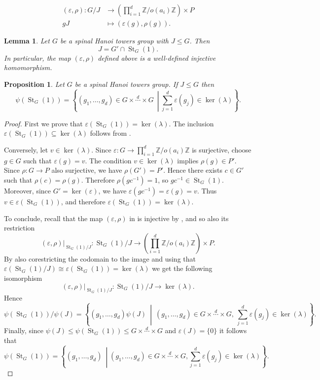 \documentclass[10pt,a4paper]{amsart}
\newtheorem{proposition}{Proposition}
\newtheorem{lemma}{Lemma}
\DeclareMathOperator{\St}{St}
\begin{document}
\begin{align}\label{GJhookexplicit}
    (\varepsilon,\rho):G/J&\longrightarrow \left(\prod_{i=1}^d\mathbb Z/o(a_i)\mathbb Z \right)\times P\\
    gJ&\longmapsto (\varepsilon(g),\rho(g)).\nonumber
\end{align}

\begin{lemma}\label{lem:JeqGprimeSt}
Let $G$ be a spinal Hanoi towers group with $J\leq G$. Then
\[
J=G'\cap \St_G(1).
\]
In particular, the map $(\varepsilon,\rho)$ defined above is a well-defined injective homomorphism.
\end{lemma}

\begin{proposition}\label{prop:sufficient-condition-first-stabilizer}
Let $G$ be a spinal Hanoi towers group. If $J\leq G$ then 
\[
\psi(\St_G(1))
=
\left\{
(g_1,\ldots,g_d)\in G\times \stackrel{d}{\cdots}\times G \ \middle| \sum_{j=1}^d \varepsilon(g_j)\in \ker(\lambda)
\right\}.
\]
\end{proposition}

\begin{proof}
First we prove that $\varepsilon(\St_G(1))=\ker(\lambda)$.
The inclusion $\varepsilon(\St_G(1))\subseteq \ker(\lambda)$ follows from .


Conversely, let $v\in\ker(\lambda)$. Since $\varepsilon:G\to \prod_{i=1}^d \mathbb Z/o(a_i)\mathbb Z$
is surjective, choose $g\in G$ such that $\varepsilon(g)=v$. The condition $v\in\ker(\lambda)$ implies $\rho(g)\in P'$. Since $\rho:G\to P$ also surjective, we have $\rho(G')=P'$. Hence there exists $c\in G'$ such that $\rho(c)=\rho(g)$. Therefore $\rho(gc^{-1})=1$, so $gc^{-1}\in \St_G(1)$. Moreover, since $G'=\ker(\varepsilon)$, we have $\varepsilon(gc^{-1})=\varepsilon(g)=v$.
Thus $v\in \varepsilon(\St_G(1))$, and therefore $\varepsilon(\St_G(1))=\ker(\lambda)$. 

To conclude, recall that the map $(\varepsilon,\rho)$ in  is injective by , and so also its restriction
\[
(\varepsilon,\rho)|_{\St_G(1)/J}:\St_G(1)/J\longrightarrow \left(\prod_{i=1}^d\mathbb Z/o(a_i)\mathbb Z \right)\times P.
\]
By also corestricting the codomain to the image and using that $\varepsilon(\St_G(1)/J)\cong\varepsilon(\St_G(1))=\ker(\lambda)$  we get the following isomorphism
\[
(\varepsilon,\rho)|_{\St_G(1)/J}:\St_G(1)/J\longrightarrow \ker(\lambda).
\]
Hence
\[
\psi(\St_G(1))/\psi(J)
=
\left\{
(g_1,\ldots,g_d)\psi(J)
\ \middle|\
(g_1,\ldots,g_d)\in G\times \stackrel{d}{\cdots}\times G,\ 
\sum_{j=1}^d \varepsilon(g_j)\in \ker(\lambda)
\right\}.
\]
Finally, since $\psi(J)\leq\psi(\St_G(1))\leq G\times \stackrel{d}{\cdots}\times G$ and $\varepsilon(J)=\{0\}$ it follows that
\[
\psi(\St_G(1))
=
\left\{
(g_1,\ldots,g_d) \ \middle| (g_1,\ldots,g_d)\in G\times \stackrel{d}{\cdots}\times G,\sum_{j=1}^d \varepsilon(g_j)\in \ker(\lambda)
\right\}.
\]

\end{proof}
\end{document}
